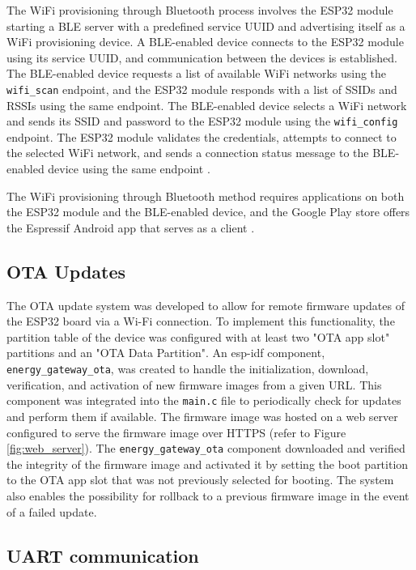 The WiFi provisioning through Bluetooth process involves the ESP32 module starting a BLE server with a predefined service UUID and advertising itself as a WiFi provisioning device. A BLE-enabled device connects to the ESP32 module using its service UUID, and communication between the devices is established. The BLE-enabled device requests a list of available WiFi networks using the \texttt{wifi\_scan} endpoint, and the ESP32 module responds with a list of SSIDs and RSSIs using the same endpoint. The BLE-enabled device selects a WiFi network and sends its SSID and password to the ESP32 module using the \texttt{wifi\_config} endpoint. The ESP32 module validates the credentials, attempts to connect to the selected WiFi network, and sends a connection status message to the BLE-enabled device using the same endpoint \cite{espressif:esp-idf-programming-guide}.

The WiFi provisioning through Bluetooth method requires applications on both the ESP32 module and the BLE-enabled device, and the Google Play store offers the Espressif Android app that serves as a client \cite{google-play:esp-ble-provisioning}.

\subsection{OTA Updates}

The OTA update system was developed to allow for remote firmware updates of the ESP32 board via a Wi-Fi connection. To implement this functionality, the partition table of the device was configured with at least two "OTA app slot" partitions and an "OTA Data Partition". An esp-idf component, \texttt{energy\_gateway\_ota}, was created to handle the initialization, download, verification, and activation of new firmware images from a given URL. This component was integrated into the \texttt{main.c} file to periodically check for updates and perform them if available. The firmware image was hosted on a web server configured to serve the firmware image over HTTPS (refer to Figure \ref{fig:web_server}). The \texttt{energy\_gateway\_ota} component downloaded and verified the integrity of the firmware image and activated it by setting the boot partition to the OTA app slot that was not previously selected for booting. The system also enables the possibility for rollback to a previous firmware image in the event of a failed update.

\subsection{UART communication}

